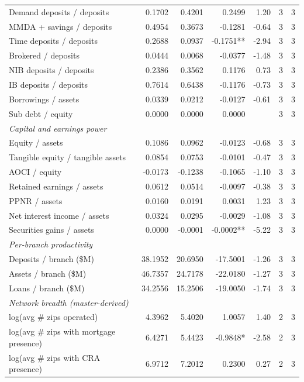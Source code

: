 \begin{tabular}{lrrrrrr}
Demand deposits / deposits & 0.1702 & 0.4201 & 0.2499 & 1.20 & 3 & 3 \\
MMDA + savings / deposits & 0.4954 & 0.3673 & -0.1281 & -0.64 & 3 & 3 \\
Time deposits / deposits & 0.2688 & 0.0937 & -0.1751** & -2.94 & 3 & 3 \\
Brokered / deposits & 0.0444 & 0.0068 & -0.0377 & -1.48 & 3 & 3 \\
NIB deposits / deposits & 0.2386 & 0.3562 & 0.1176 & 0.73 & 3 & 3 \\
IB deposits / deposits & 0.7614 & 0.6438 & -0.1176 & -0.73 & 3 & 3 \\
Borrowings / assets & 0.0339 & 0.0212 & -0.0127 & -0.61 & 3 & 3 \\
Sub debt / equity & 0.0000 & 0.0000 & 0.0000 &  & 3 & 3 \\
\midrule
\multicolumn{7}{l}{\emph{Capital and earnings power}} \\
\midrule
Equity / assets & 0.1086 & 0.0962 & -0.0123 & -0.68 & 3 & 3 \\
Tangible equity / tangible assets & 0.0854 & 0.0753 & -0.0101 & -0.47 & 3 & 3 \\
AOCI / equity & -0.0173 & -0.1238 & -0.1065 & -1.10 & 3 & 3 \\
Retained earnings / assets & 0.0612 & 0.0514 & -0.0097 & -0.38 & 3 & 3 \\
PPNR / assets & 0.0160 & 0.0191 & 0.0031 & 1.23 & 3 & 3 \\
Net interest income / assets & 0.0324 & 0.0295 & -0.0029 & -1.08 & 3 & 3 \\
Securities gains / assets & 0.0000 & -0.0001 & -0.0002** & -5.22 & 3 & 3 \\
\midrule
\multicolumn{7}{l}{\emph{Per-branch productivity}} \\
\midrule
Deposits / branch (\$M) & 38.1952 & 20.6950 & -17.5001 & -1.26 & 3 & 3 \\
Assets / branch (\$M) & 46.7357 & 24.7178 & -22.0180 & -1.27 & 3 & 3 \\
Loans / branch (\$M) & 34.2556 & 15.2506 & -19.0050 & -1.74 & 3 & 3 \\
\midrule
\multicolumn{7}{l}{\emph{Network breadth (master-derived)}} \\
\midrule
log(avg \# zips operated) & 4.3962 & 5.4020 & 1.0057 & 1.40 & 2 & 3 \\
log(avg \# zips with mortgage presence) & 6.4271 & 5.4423 & -0.9848* & -2.58 & 2 & 3 \\
log(avg \# zips with CRA presence) & 6.9712 & 7.2012 & 0.2300 & 0.27 & 2 & 3 \\

\end{tabular}
